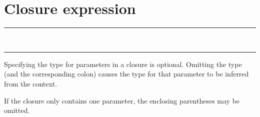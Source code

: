 \section{Closure expression}

\begin{grammar}
\rule{closure-expression} \code{(}  \code{)} \code{->} \\
\rule{closure-expression} \code{(}  \code{)} \code{->} 
\end{grammar}

Specifying the type for parameters in a closure  is
optional. Omitting the type (and the corresponding colon) causes the type for
that parameter to be inferred from the context.

If the closure  only contains one parameter, the
enclosing parentheses may be omitted.
